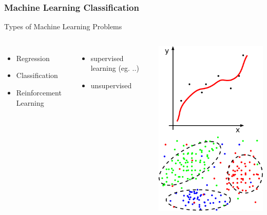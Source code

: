 \begin{frame}
  \frametitle{Machine Learning Classification}
  Types of Machine Learning Problems
  \begin{columns}
    \begin{itemize}
    \item Regression
    \item Classification
    \item Reinforcement Learning
    \end{itemize}
    \begin{itemize}
    \item supervised learning (eg. ..)
    \item unsupervised
    \end{itemize}
    \includegraphics[width=\textwidth]{graphics/ml-intro/ml.pdf}
  \end{columns}
\end{frame}
